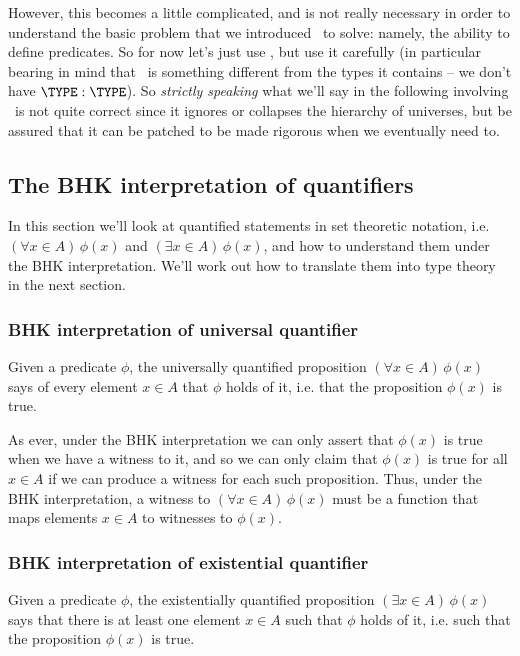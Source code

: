 However, this becomes a little complicated, and is not really necessary in order to understand the basic problem that we introduced \TYPE\ to solve: namely, the ability to define predicates.  So for now let's just use \TYPE, but use it carefully (in particular bearing in mind that \TYPE\ is something different from the types it contains -- we don't have $\TYPE:\TYPE$).  So \emph{strictly speaking} what we'll say in the following involving \TYPE\ is not quite correct since it ignores or collapses the hierarchy of universes, but be assured that it can be patched to be made rigorous when we eventually need to.

\newpage
\subsection{The BHK interpretation of quantifiers}
\label{sec:Quantifiers-BHKQuantifiers}

In this section we'll look at quantified statements in set theoretic notation, i.e. 
$(\forall x \in A)\, \phi(x)$ and 
$(\exists x \in A)\, \phi(x)$, and how to understand them under the BHK interpretation.  We'll work out how to translate them into type theory in the next section.

\subsubsection{BHK interpretation of universal quantifier}

Given a predicate $\phi$, the universally quantified proposition 
$(\forall x \in A)\, \phi(x)$
says of every element $x \in A$ that $\phi$ holds of it, i.e. that the proposition $\phi(x)$ is true.

As ever, under the BHK interpretation we can only assert that $\phi(x)$ is true when we have a witness to it, and so we can only claim that $\phi(x)$ is true for all $x \in A$
if we can produce a witness for each such proposition.  Thus, under the BHK interpretation, a witness to 
$(\forall x \in A)\, \phi(x)$
must be a function that maps elements $x \in A$ to witnesses to $\phi(x)$.




\subsubsection{BHK interpretation of existential quantifier}


Given a predicate $\phi$, the existentially quantified proposition 
$(\exists x \in A)\, \phi(x)$
says that there is at least one element $x \in A$ such that $\phi$ holds of it, i.e. such that the proposition $\phi(x)$ is true.

